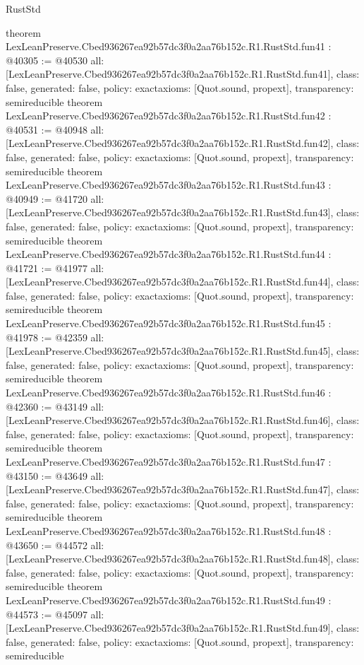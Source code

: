 \begin{lexlean}{RustStd}
\begin{coremodule}
{}
theorem LexLeanPreserve.Cbed936267ea92b57dc3f0a2aa76b152c.R1.RustStd.fun41 : @40305 := @40530 {
  all: [LexLeanPreserve.Cbed936267ea92b57dc3f0a2aa76b152c.R1.RustStd.fun41],
  class: false,
  generated: false,
  policy: exact{axioms: [Quot.sound, propext]},
  transparency: semireducible
}
theorem LexLeanPreserve.Cbed936267ea92b57dc3f0a2aa76b152c.R1.RustStd.fun42 : @40531 := @40948 {
  all: [LexLeanPreserve.Cbed936267ea92b57dc3f0a2aa76b152c.R1.RustStd.fun42],
  class: false,
  generated: false,
  policy: exact{axioms: [Quot.sound, propext]},
  transparency: semireducible
}
theorem LexLeanPreserve.Cbed936267ea92b57dc3f0a2aa76b152c.R1.RustStd.fun43 : @40949 := @41720 {
  all: [LexLeanPreserve.Cbed936267ea92b57dc3f0a2aa76b152c.R1.RustStd.fun43],
  class: false,
  generated: false,
  policy: exact{axioms: [Quot.sound, propext]},
  transparency: semireducible
}
theorem LexLeanPreserve.Cbed936267ea92b57dc3f0a2aa76b152c.R1.RustStd.fun44 : @41721 := @41977 {
  all: [LexLeanPreserve.Cbed936267ea92b57dc3f0a2aa76b152c.R1.RustStd.fun44],
  class: false,
  generated: false,
  policy: exact{axioms: [Quot.sound, propext]},
  transparency: semireducible
}
theorem LexLeanPreserve.Cbed936267ea92b57dc3f0a2aa76b152c.R1.RustStd.fun45 : @41978 := @42359 {
  all: [LexLeanPreserve.Cbed936267ea92b57dc3f0a2aa76b152c.R1.RustStd.fun45],
  class: false,
  generated: false,
  policy: exact{axioms: [Quot.sound, propext]},
  transparency: semireducible
}
theorem LexLeanPreserve.Cbed936267ea92b57dc3f0a2aa76b152c.R1.RustStd.fun46 : @42360 := @43149 {
  all: [LexLeanPreserve.Cbed936267ea92b57dc3f0a2aa76b152c.R1.RustStd.fun46],
  class: false,
  generated: false,
  policy: exact{axioms: [Quot.sound, propext]},
  transparency: semireducible
}
theorem LexLeanPreserve.Cbed936267ea92b57dc3f0a2aa76b152c.R1.RustStd.fun47 : @43150 := @43649 {
  all: [LexLeanPreserve.Cbed936267ea92b57dc3f0a2aa76b152c.R1.RustStd.fun47],
  class: false,
  generated: false,
  policy: exact{axioms: [Quot.sound, propext]},
  transparency: semireducible
}
theorem LexLeanPreserve.Cbed936267ea92b57dc3f0a2aa76b152c.R1.RustStd.fun48 : @43650 := @44572 {
  all: [LexLeanPreserve.Cbed936267ea92b57dc3f0a2aa76b152c.R1.RustStd.fun48],
  class: false,
  generated: false,
  policy: exact{axioms: [Quot.sound, propext]},
  transparency: semireducible
}
theorem LexLeanPreserve.Cbed936267ea92b57dc3f0a2aa76b152c.R1.RustStd.fun49 : @44573 := @45097 {
  all: [LexLeanPreserve.Cbed936267ea92b57dc3f0a2aa76b152c.R1.RustStd.fun49],
  class: false,
  generated: false,
  policy: exact{axioms: [Quot.sound, propext]},
  transparency: semireducible
}
\end{coremodule}
\end{lexlean}
